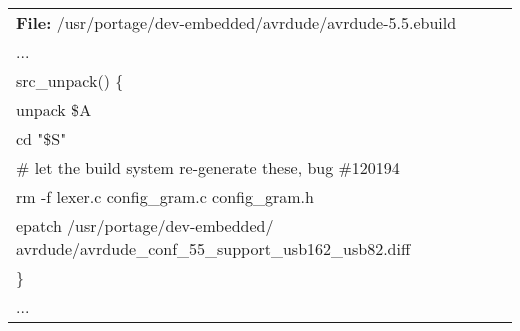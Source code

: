 \begin{center}
	\vspace{-\baselineskip}
	\begin{tabular}{|l|} \hline
		\rowcolor[gray]{0.9}
		\begin{minipage}[c]{\textwidth - 2\tabcolsep}
			\textbf{File:} 
			/usr/portage/dev-embedded/avrdude/avrdude-5.5.ebuild
		\end{minipage}\\	
	...\\
	src\_unpack() \{ 	\\
        unpack \${A}	\\
        cd "\${S}"		\\
        \# let the build system re-generate these, bug \#120194	\\
        rm -f lexer.c config\_gram.c config\_gram.h	\\
        epatch 
		/usr/portage/dev-embedded/
		avrdude/avrdude\_conf\_55\_support\_usb162\_usb82.diff	\\
	\}	\\
	...\\
	\hline
	\end{tabular}	
\end{center}
